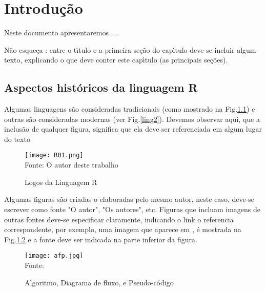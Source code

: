 % 



\chapter{ Introdu\c{c}\~{a}o}

Neste documento apresentaremos ....

N\~{a}o esque\c{c}a : entre o t\'{\i}tulo e a primeira se\c{c}\~{a}o do cap\'{\i}tulo deve se incluir algum texto, explicando o que deve conter este cap\'{\i}tulo (as principais se\c{c}\~{o}es).


   \section{Aspectos hist\'{o}ricos da linguagem R}



Algumas linguagens s\~{a}o consideradas  tradicionais (como mostrado na Fig.\ref{ling1}) e outras s\~{a}o consideradas modernas (ver Fig.\ref{ling2}). Devemos observar aqui, que a inclus\~{a}o de qualquer figura, significa que ela deve ser referenciada em algum lugar do texto
   \begin{figure}[H]
    \begin{center}
        \caption{Logos da Linguagem R} \label{ling1}
        \texttt{[image: R01.png]} \\
        {\tiny \sf Fonte: O autor deste trabalho }
    \end{center}
   \end{figure}

Algumas figuras s\~{a}o criadas o elaboradas pelo mesmo autor, neste caso, deve-se escrever como fonte "O autor", "Os autores", etc. Figuras que incluam imagens de outras fontes deve-se especificar claramente, indicando o link o referencia correspondente, por exemplo, uma imagem que aparece em \cite[p. 93]{Sprankle2012}, \'{e} mostrada na Fig.\ref{afp} e a fonte deve ser indicada na parte inferior da figura.
   \begin{figure}[H]
    \begin{center}
        \caption{Algoritmo, Diagrama de fluxo, e Pseudo-c\'{o}digo} \label{afp}
        \texttt{[image: afp.jpg]} \\
        {\tiny \sf Fonte: \cite[p. 93]{Sprankle2012} }
    \end{center}
   \end{figure}

